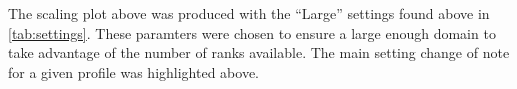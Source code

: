 \vspace{-0.75cm}
The scaling plot above was produced with the ``Large'' settings found above in \tabl\ref{tab:settings}. These paramters were chosen to ensure a large enough domain to take advantage of the number of ranks available.
The main setting change of note for a given profile was highlighted above.

